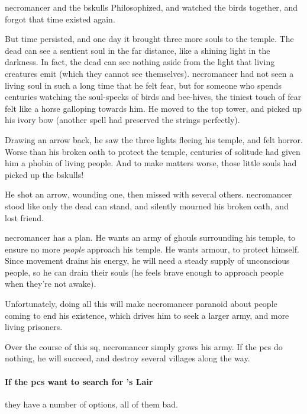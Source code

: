 \begin{exampletext}
  \Gls{necromancer} and the \gls{bskulls} Philosophized, and watched the birds together, and forgot that time existed again.

  But time persisted, and one day it brought three more souls to the temple.
  The dead can see a sentient soul in the far distance, like a shining light in the darkness.
  In fact, the dead can see nothing aside from the light that living creatures emit (which they cannot see themselves).%
  \Gls{necromancer} had not seen a living soul in such a long time that he felt fear, but for someone who spends centuries watching the soul-specks of birds and bee-hives, the tiniest touch of fear felt like a horse galloping towards him.
  He moved to the top tower, and picked up his ivory bow (another spell had preserved the strings perfectly).

  Drawing an arrow back, he saw the three lights fleeing his temple, and felt horror.
  Worse than his broken oath to protect the temple, centuries of solitude had given him a phobia of living people.
  And to make matters worse, those little souls had picked up the \gls{bskulls}!

  He shot an arrow, wounding one, then missed with several others.
  \Gls{necromancer} stood like only the dead can stand, and silently mourned his broken oath, and lost friend.

\end{exampletext}

\Gls{necromancer} has a plan.
He wants an army of ghouls surrounding his temple, to ensure no more \emph{people} approach his temple.
He wants armour, to protect himself.
Since movement drains his energy, he will need a steady supply of unconscious people, so he can drain their souls (he feels brave enough to approach people when they're not awake).

Unfortunately, doing all this will make \gls{necromancer} paranoid about people coming to end his existence, which drives him to seek a larger army, and more living prisoners.

Over the course of this \gls{sq}, \gls{necromancer} simply grows his army.
If the \glspl{pc} do nothing, he will succeed, and destroy several \glspl{village} along the way.

\paragraph{If the \glspl{pc} want to search for 's Lair}
\label{huntingNecro}
they have a number of options, all of them bad.

